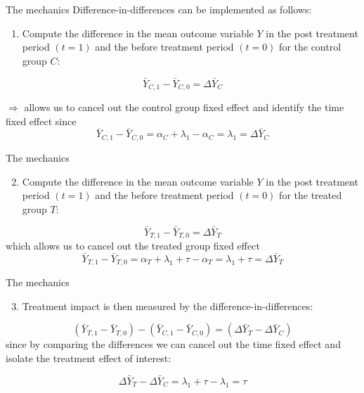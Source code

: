 \documentclass[
  ignorenonframetext,
]{beamer}
\providecommand{\tightlist}{%
  \setlength{\itemsep}{0pt}\setlength{\parskip}{0pt}}
\begin{document}
\begin{frame}{The mechanics}
\protect\hypertarget{the-mechanics}{}
Difference-in-differences can be implemented as follows:

\begin{enumerate}
[1)]
\tightlist
\item
  Compute the difference in the mean outcome variable \(Y\) in the post
  treatment period \((t=1)\) and the before treatment period \((t=0)\)
  for the control group \(C\):
\end{enumerate}

\[
\bar{Y}_{C,1}-\bar{Y}_{C,0}=\Delta \bar{Y}_C
\]

\(\Rightarrow\) allows us to cancel out the control group fixed effect
and identify the time fixed effect since \[
\bar{Y}_{C,1}-\bar{Y}_{C,0}=\alpha_C+\lambda_1-\alpha_C=\lambda_1=\Delta \bar{Y}_C
\]
\end{frame}

\begin{frame}{The mechanics}
\protect\hypertarget{the-mechanics-1}{}
\begin{enumerate}
[1)]
\setcounter{enumi}{1}
\tightlist
\item
  Compute the difference in the mean outcome variable \(Y\) in the post
  treatment period \((t=1)\) and the before treatment period \((t=0)\)
  for the treated group \(T\):
\end{enumerate}

\[
\bar{Y}_{T,1}-\bar{Y}_{T,0}=\Delta \bar{Y}_T
\] which allows us to cancel out the treated group fixed effect \[
\bar{Y}_{T,1}-\bar{Y}_{T,0}=\alpha_T+\lambda_1+\tau-\alpha_T=\lambda_1+\tau=\Delta \bar{Y}_T
\]
\end{frame}

\begin{frame}{The mechanics}
\protect\hypertarget{the-mechanics-2}{}
\begin{enumerate}
[1)]
\setcounter{enumi}{2}
\tightlist
\item
  Treatment impact is then measured by the difference-in-differences:
\end{enumerate}

\[
(\bar{Y}_{T,1}-\bar{Y}_{T,0})-(\bar{Y}_{C,1}-\bar{Y}_{C,0})=(\Delta \bar{Y}_T-\Delta \bar{Y}_C)
\] since by comparing the differences we can cancel out the time fixed
effect and isolate the treatment effect of interest:

\[
\Delta \bar{Y}_T-\Delta \bar{Y}_C=\lambda_1+\tau-\lambda_1=\tau
\]
\end{frame}
\end{document}
